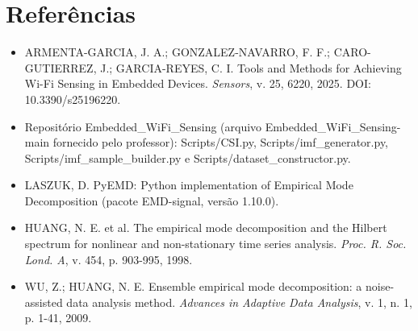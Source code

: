 \section{Referências}

\begin{itemize}
    \item ARMENTA-GARCIA, J. A.; GONZALEZ-NAVARRO, F. F.; CARO-GUTIERREZ, J.; GARCIA-REYES, C. I. Tools and Methods for Achieving Wi-Fi Sensing in Embedded Devices. \textit{Sensors}, v. 25, 6220, 2025. DOI: 10.3390/s25196220.
    \item Repositório Embedded\_WiFi\_Sensing (arquivo Embedded\_WiFi\_Sensing-main fornecido pelo professor): Scripts/CSI.py, Scripts/imf\_generator.py, Scripts/imf\_sample\_builder.py e Scripts/dataset\_constructor.py.
    \item LASZUK, D. PyEMD: Python implementation of Empirical Mode Decomposition (pacote EMD-signal, versão 1.10.0).
    \item HUANG, N. E. et al. The empirical mode decomposition and the Hilbert spectrum for nonlinear and non-stationary time series analysis. \textit{Proc. R. Soc. Lond. A}, v. 454, p. 903-995, 1998.
    \item WU, Z.; HUANG, N. E. Ensemble empirical mode decomposition: a noise-assisted data analysis method. \textit{Advances in Adaptive Data Analysis}, v. 1, n. 1, p. 1-41, 2009.
\end{itemize}
\newpage
